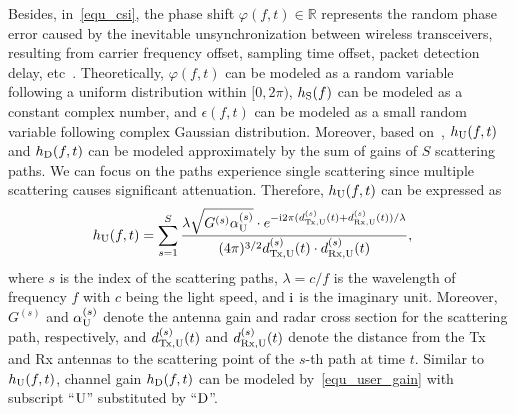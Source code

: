 Besides, in~\eqref{equ_csi}, the phase shift $\varphi(f,t)\in\mathbb R$ represents the random phase error caused by the inevitable unsynchronization between wireless transceivers, resulting from carrier frequency offset, sampling time offset, packet detection delay, etc~\cite{Chen23ACS_CDWIFI}.
Theoretically, $\varphi(f,t)$ can be modeled as a random variable following a uniform distribution within $[0,2\pi)$, $h_{\mathrm{S}}(f)$ can be modeled as a constant complex number, and $\epsilon(f,t)$ can be modeled as a small random variable following complex Gaussian distribution. 
Moreover, based on~\cite{goldsmith2005wireless}, $h_{\mathrm{U}}(f, t) $ and $h_{\mathrm{D}}(f, t)$ can be modeled approximately by the sum of gains of $S$ scattering paths.
We can focus on the paths experience single scattering since multiple scattering causes significant attenuation.
Therefore, $h_{\mathrm{U}}(f, t) $ can be expressed as
\begin{align}
    \label{equ_user_gain}
    & h_{\mathrm{U}}(f,t) =\sum_{s=1}^S   \frac{\lambda \sqrt{G^{(s)}\alpha_{\mathrm{U}}^{(s)}}\cdot e^{-\mathrm{i} 2\pi (d_{\mathrm{Tx}, \mathrm{U}}^{(s)}(t)+d_{\mathrm{Rx}, \mathrm{U}}^{(s)}(t))/\lambda}}{ (4\pi)^{3/2} d_{\mathrm{Tx}, \mathrm{U}}^{(s)}(t)\cdot d_{\mathrm{Rx}, \mathrm{U}}^{(s)}(t) },
\end{align}
where $s$ is the index of the scattering paths, $\lambda = c/f$ is the wavelength of frequency $f$ with $c$ being the light speed, and $\mathrm{i}$ is the imaginary unit.
Moreover, ${G^{(s)}}$ and $\alpha_{\mathrm{U}}^{(s)}$ denote the antenna gain and radar cross section for the scattering path, respectively, and $d_{\mathrm{Tx}, \mathrm{U}}^{(s)}(t)$ and $d_{\mathrm{Rx}, \mathrm{U}}^{(s)}(t)$ denote the distance from the Tx and Rx antennas to the scattering point of the $s$-th path at time $t$.
Similar to $h_{\mathrm{U}}(f, t)$, channel gain $h_{\mathrm{D}}(f, t)$ can be modeled by~\eqref{equ_user_gain} with subscript ``$\mathrm{U}$'' substituted by ``$\mathrm{D}$''.


